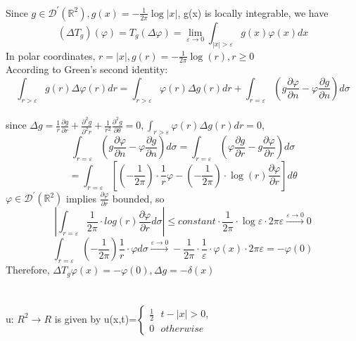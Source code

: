 \documentclass{article}
\begin{document}
\section{}
Since $g \in \mathcal { D } ^ { \prime } \left( \mathbb { R } ^ { 2 } \right), g ( x ) = - \frac { 1 } { 2 \pi } \log | x |$, g(x) is locally integrable, we have $$ \left( \Delta T _ { g } \right) ( \varphi ) = T _ { g } ( \Delta \varphi ) = \lim _ { \varepsilon \rightarrow 0 } \int _ { | x | > \varepsilon } g ( x ) \varphi(x)d x $$
	In polar coordinates, $r=|x|, g ( r ) = - \frac { 1 } { 2 \pi } \log ( r ) , r\geq 0$
	\\According to Green’s second identity:$$\int _ { r > \varepsilon } g ( r ) \Delta \varphi ( r ) d r = \int _ { r > \varepsilon } \varphi ( r ) \Delta g ( r ) d r + \int _ { r = \varepsilon } \left( g \frac { \partial \varphi } { \partial n } - \varphi \frac { \partial g } { \partial n } \right) d \sigma$$
	\\since $\Delta g = \frac { 1 } { r } \frac { \partial g } {\partial r } + \frac { \partial ^ { 2 } g } { \partial ^ { 2 } r } + \frac { 1 } { r ^ { 2 } } \frac { \partial ^ { 2 } g } { \partial \theta } = 0, \int _ { r > \varepsilon } \varphi ( r ) \Delta g ( r ) d r=0 $, 
	$$\int _ { r = \varepsilon } \left( g \frac { \partial \varphi } { \partial n } - \varphi \frac { \partial g } { \partial n } \right) d \sigma=\int _ { r = \varepsilon } \left( \varphi \frac { \partial g } { \partial r } - g \frac { \partial \varphi } { \partial r } \right) d \sigma$$
    $$=\int _ { r = \varepsilon } \left[\left( - \frac { 1 } { 2 \pi } \right) \cdot \frac { 1 } { r } \varphi - \left( - \frac { 1 } { 2 \pi } \right) \cdot \log ( r ) \frac { \partial  \varphi } { \partial r } \right] d \theta$$
	$\varphi \in \mathcal { D } ^ { \prime } \left( \mathbb { R } ^ { 2 } \right)$ implies $\frac { \partial \varphi } { \partial r }$ bounded, so 
	$$ \left| \int _ { r = \varepsilon }  \frac { 1 } { 2 \pi } \cdot log ( r ) \frac { \partial \varphi } { \partial r } d \sigma \right| \leq  constant \cdot \frac { 1 } { 2 \pi }\cdot \log  \varepsilon \cdot 2 \pi \varepsilon \stackrel { \varepsilon \rightarrow 0 } { \longrightarrow } 0$$
    $$ \int _ { r = \varepsilon } \left( - \frac { 1 } { 2 \pi } \right) \frac { 1 } { r } \cdot \varphi d \sigma\stackrel {\varepsilon \rightarrow 0 } { \longrightarrow } - \frac { 1 } { 2 \pi } \cdot \frac { 1 } { \varepsilon } \cdot  \varphi ( x ) \cdot 2 \pi \varepsilon = - \varphi ( 0 )$$
    Therefore, $\Delta T _ { g } \varphi(x)= - \varphi ( 0 ),  \Delta g = -\delta ( x ) $
\section{}
u: $R^2\rightarrow{}R $ is given by u(x,t)=$\left\{\begin{array}{l}\frac{1}{2}\ \
\ t-\left\vert{}x\right\vert{}>0, \\
0\ \ \ otherwise\end{array}\right.$
\end{document}
